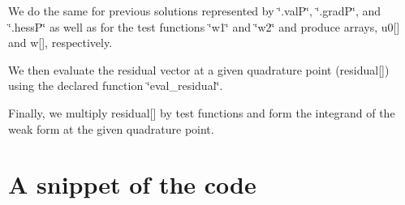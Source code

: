 \begin{DoxyCodeInclude}

\end{DoxyCodeInclude}


We do the same for previous solutions represented by \char`\"{}.\-val\-P\char`\"{}, \char`\"{}.\-grad\-P\char`\"{}, and \char`\"{}.\-hess\-P\char`\"{} as well as for the test functions \char`\"{}w1\char`\"{} and \char`\"{}w2\char`\"{} and produce arrays, u0\mbox{[}\mbox{]} and w\mbox{[}\mbox{]}, respectively.

We then evaluate the residual vector at a given quadrature point (residual\mbox{[}\mbox{]}) using the declared function \char`\"{}eval\-\_\-residual\char`\"{}.


\begin{DoxyCodeInclude}

\end{DoxyCodeInclude}


Finally, we multiply residual\mbox{[}\mbox{]} by test functions and form the integrand of the weak form at the given quadrature point.


\begin{DoxyCodeInclude}

\end{DoxyCodeInclude}


\section*{A snippet of the code }

 
\begin{DoxyCodeInclude}

\end{DoxyCodeInclude}
 